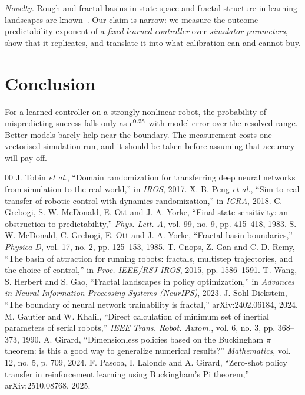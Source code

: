 \documentclass[conference]{IEEEtran}
\begin{document}
\emph{Novelty.} Rough and fractal basins in state space and fractal structure in learning landscapes are
known~\cite{grebogi1983,mcdonald1985,cnops2015,wang2023,sohldickstein2024}. Our claim is narrow: we measure
the outcome-predictability exponent of a \emph{fixed learned controller} over \emph{simulator parameters},
show that it replicates, and translate it into what calibration can and cannot buy.

\section{Conclusion}
For a learned controller on a strongly nonlinear robot, the probability of mispredicting success falls
only as $\epsilon^{0.28}$ with model error over the resolved range. Better models barely help near the
boundary. The measurement costs one vectorised simulation run, and it should be taken before assuming
that accuracy will pay off.

\begin{thebibliography}{00}
 J. Tobin \emph{et al.}, ``Domain randomization for
transferring deep neural networks from simulation to the real world,'' in
\emph{IROS}, 2017.
 X. B. Peng \emph{et al.}, ``Sim-to-real transfer of robotic
control with dynamics randomization,'' in \emph{ICRA}, 2018.
 C. Grebogi, S. W. McDonald, E. Ott and J. A. Yorke, ``Final state sensitivity: an
obstruction to predictability,'' \emph{Phys. Lett. A}, vol. 99, no. 9, pp. 415--418, 1983.
 S. W. McDonald, C. Grebogi, E. Ott and J. A. Yorke, ``Fractal basin boundaries,''
\emph{Physica D}, vol. 17, no. 2, pp. 125--153, 1985.
 T. Cnops, Z. Gan and C. D. Remy, ``The basin of attraction for running robots:
fractals, multistep trajectories, and the choice of control,'' in \emph{Proc. IEEE/RSJ IROS}, 2015,
pp. 1586--1591.
 T. Wang, S. Herbert and S. Gao, ``Fractal landscapes in policy optimization,'' in
\emph{Advances in Neural Information Processing Systems (NeurIPS)}, 2023.
 J. Sohl-Dickstein, ``The boundary of neural network trainability is
fractal,'' arXiv:2402.06184, 2024.
 M. Gautier and W. Khalil, ``Direct calculation of minimum set of inertial
parameters of serial robots,'' \emph{IEEE Trans. Robot. Autom.}, vol. 6, no. 3, pp. 368--373, 1990.
 A. Girard, ``Dimensionless policies based on the Buckingham $\pi$ theorem: is this a
good way to generalize numerical results?'' \emph{Mathematics}, vol. 12, no. 5, p. 709, 2024.
 F. Pascoa, I. Lalonde and A. Girard, ``Zero-shot policy
transfer in reinforcement learning using Buckingham's Pi theorem,''
arXiv:2510.08768, 2025.
\end{thebibliography}
\end{document}
